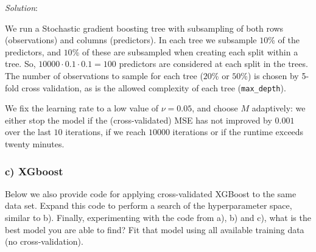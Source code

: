 \documentclass[
]{article}
\newenvironment{Shaded}{\begin{snugshade}}{\end{snugshade}}
\newcommand{\AttributeTok}[1]{\textcolor[rgb]{0.13,0.29,0.53}{#1}}
\newcommand{\CommentTok}[1]{\textcolor[rgb]{0.56,0.35,0.01}{\textit{#1}}}
\newcommand{\ConstantTok}[1]{\textcolor[rgb]{0.56,0.35,0.01}{#1}}
\newcommand{\DecValTok}[1]{\textcolor[rgb]{0.00,0.00,0.81}{#1}}
\newcommand{\FloatTok}[1]{\textcolor[rgb]{0.00,0.00,0.81}{#1}}
\newcommand{\FunctionTok}[1]{\textcolor[rgb]{0.13,0.29,0.53}{\textbf{#1}}}
\newcommand{\NormalTok}[1]{#1}
\newcommand{\OtherTok}[1]{\textcolor[rgb]{0.56,0.35,0.01}{#1}}
\newcommand{\SpecialCharTok}[1]{\textcolor[rgb]{0.81,0.36,0.00}{\textbf{#1}}}
\begin{document}
\emph{Solution}:

We run a Stochastic gradient boosting tree with subsampling of both rows
(observations) and columns (predictors). In each tree we subsample
\(10\)\% of the predictors, and \(10\)\% of these are subsampled when
creating each split within a tree. So,
\(10 000 \cdot 0.1\cdot 0.1 = 100\) predictors are considered at each
split in the trees. The number of observations to sample for each tree
(\(20\)\% or \(50\)\%) is chosen by 5-fold cross validation, as is the
allowed complexity of each tree (\texttt{max\_depth}).

We fix the learning rate to a low value of \(\nu = 0.05\), and choose
\(M\) adaptively: we either stop the model if the (cross-validated) MSE
has not improved by \(0.001\) over the last \(10\) iterations, if we
reach \(10000\) iterations or if the runtime exceeds twenty minutes.

\hypertarget{c-xgboost}{%
\subsubsection{c) XGboost}\label{c-xgboost}}

Below we also provide code for applying cross-validated XGBoost to the
same data set. Expand this code to perform a search of the
hyperparameter space, similar to b). Finally, experimenting with the
code from a), b) and c), what is the best model you are able to find?
Fit that model using all available training data (no cross-validation).

\begin{Shaded}
\end{Shaded}
\end{document}
